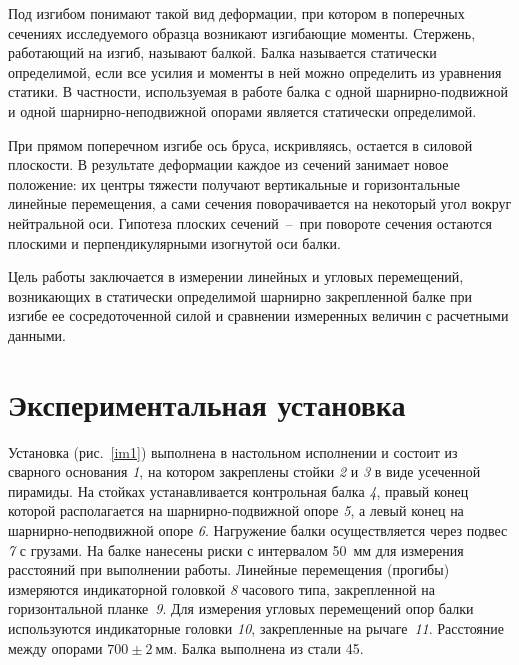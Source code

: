 \documentclass[12pt, a4paper]{article}
\begin{document}
    Под изгибом понимают такой вид деформации, при котором в поперечных сечениях исследуемого образца возникают изгибающие моменты. Стержень, работающий на изгиб, называют балкой. Балка называется статически определимой, если все усилия и моменты в ней можно определить из уравнения статики. В частности, используемая в работе балка с одной шарнирно-подвижной и одной шарнирно-неподвижной опорами является статически определимой.
    
    При прямом поперечном изгибе ось бруса, искривляясь, остается в силовой плоскости. В результате деформации каждое из сечений занимает новое положение: их центры тяжести получают вертикальные и горизонтальные линейные перемещения, а сами сечения поворачивается на некоторый угол вокруг нейтральной оси. Гипотеза плоских сечений~--~при повороте сечения остаются плоскими и перпендикулярными изогнутой оси балки.
    
    Цель работы заключается в измерении линейных и угловых перемещений, возникающих в статически определимой шарнирно закрепленной балке при изгибе ее сосредоточенной силой и сравнении измеренных величин с расчетными данными.
    
    \newpage
    
    \section{Экспериментальная установка}
    
    Установка (рис.~\ref{im1}) выполнена в настольном исполнении и состоит из сварного основания \textit{1}, на котором закреплены стойки \textit{2} и \textit{3} в виде усеченной пирамиды. На стойках устанавливается контрольная балка \textit{4}, правый конец которой располагается на шарнирно-подвижной опоре \textit{5}, а левый конец на шарнирно-неподвижной опоре \textit{6}. Нагружение балки осуществляется через подвес \textit{7} с грузами. На балке нанесены риски с интервалом 50~мм для измерения расстояний при выполнении работы. Линейные перемещения (прогибы) измеряются индикаторной головкой \textit{8} часового типа, закрепленной на горизонтальной планке \textit{9}. Для измерения угловых перемещений опор балки используются индикаторные головки \textit{10}, закрепленные на рычаге \textit{11}. Расстояние между опорами $700 \pm 2~\text{мм}$. Балка выполнена из стали 45.
    
\end{document}
